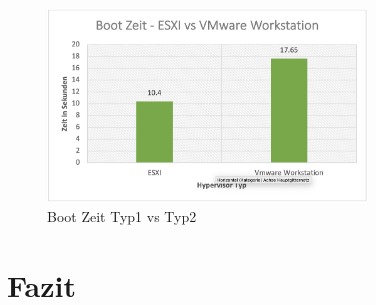 \documentclass[conference]{IEEEtran}
\begin{document}
\begin{figure}
	\centering
	\includegraphics[keepaspectratio,width=8.5cm,height=0.75\textheight]{bootzeit.png}
	\caption{Boot Zeit Typ1 vs Typ2}
	\label{architecture}
\end{figure}

\section{Fazit}
\label{Fazit}



\end{document}
